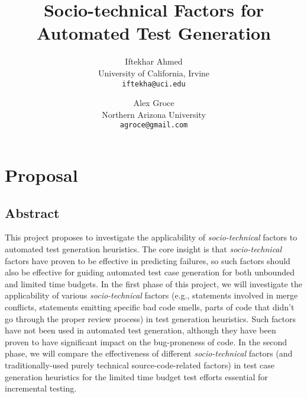 \documentclass[10pt]{article}
\title{Socio-technical Factors for Automated Test Generation \vspace{-2ex}}
\author{
  Iftekhar Ahmed\\
  University of California, Irvine\\
  \texttt{iftekha@uci.edu} \vspace{-5ex}
  \and
  Alex Groce\\
  Northern Arizona University\\
  \texttt{agroce@gmail.com}\vspace{-5ex}
}
\date{}
\begin{document}
\maketitle

\section{Proposal}

\subsection{Abstract}

This project proposes to investigate the applicability of \emph{socio-technical} factors to automated test generation heuristics. The core insight is that \emph{socio-technical} factors have proven to be effective in predicting failures, so such factors should also be effective for guiding automated test case generation for both unbounded and limited time budgets. In the first phase of this project, we will investigate the applicability of various \emph{socio-technical} factors (e.g., statements involved in merge conflicts, statements emitting specific bad code smells, parts of code that didn't go through the proper review process) in test generation heuristics. Such factors have not been used in automated test generation, although they have been proven to have significant impact on the bug-proneness of code. In the second phase, we will compare the effectiveness of different \emph{socio-technical} factors (and traditionally-used purely technical source-code-related factors) in test case generation heuristics for the limited time budget test efforts essential for incremental testing.
\end{document}
